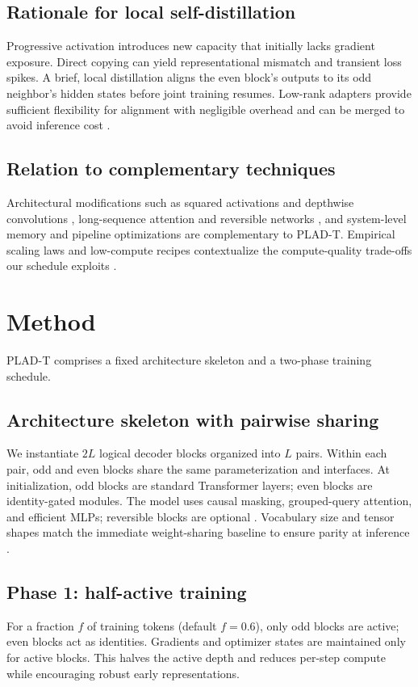 \documentclass{article}
\begin{document}
\subsection{Rationale for local self-distillation}
Progressive activation introduces new capacity that initially lacks gradient exposure. Direct copying can yield representational mismatch and transient loss spikes. A brief, local distillation aligns the even block’s outputs to its odd neighbor’s hidden states before joint training resumes. Low-rank adapters provide sufficient flexibility for alignment with negligible overhead and can be merged to avoid inference cost \cite{miles-2024-velora}.

\subsection{Relation to complementary techniques}
Architectural modifications such as squared activations and depthwise convolutions \cite{so-2021-searching}, long-sequence attention and reversible networks \cite{kitaev-2020-reformer}, and system-level memory and pipeline optimizations \cite{andoorveedu-2022-tempo,narayanan-2020-memory} are complementary to PLAD-T. Empirical scaling laws and low-compute recipes contextualize the compute-quality trade-offs our schedule exploits \cite{henighan-2020-scaling,geiping-2022-cramming}.

\section{Method}
PLAD-T comprises a fixed architecture skeleton and a two-phase training schedule.

\subsection{Architecture skeleton with pairwise sharing}
We instantiate \(2L\) logical decoder blocks organized into \(L\) pairs. Within each pair, odd and even blocks share the same parameterization and interfaces. At initialization, odd blocks are standard Transformer layers; even blocks are identity-gated modules. The model uses causal masking, grouped-query attention, and efficient MLPs; reversible blocks are optional \cite{kitaev-2020-reformer}. Vocabulary size and tensor shapes match the immediate weight-sharing baseline to ensure parity at inference \cite{liu-2024-mobilellm}.

\subsection{Phase 1: half-active training}
For a fraction \(f\) of training tokens (default \(f = 0.6\)), only odd blocks are active; even blocks act as identities. Gradients and optimizer states are maintained only for active blocks. This halves the active depth and reduces per-step compute while encouraging robust early representations.
\end{document}
